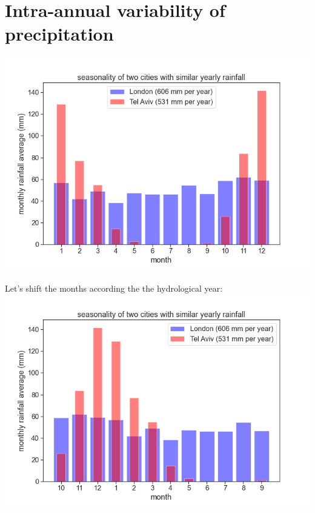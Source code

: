 \documentclass[
  letterpaper,
  DIV=11,
  numbers=noendperiod]{scrreprt}
\begin{document}
\hypertarget{intra-annual-variability-of-precipitation}{%
\chapter{Intra-annual variability of
precipitation}\label{intra-annual-variability-of-precipitation}}

\includegraphics{archive/figures/monthly_tel_aviv_london_bars.png}

Let's shift the months according the the hydrological year:\\
\includegraphics{archive/figures/monthly_tel_aviv_london_bars_hydrological_year.png}
\end{document}
